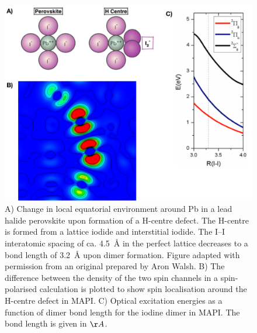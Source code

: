 \begin{figure}[h!]   %
\centering
  \includegraphics[width=0.9\columnwidth]{figures/ch6/spin_localisation.png}
  \caption[Spin localisation and optical excitation at the H-centre defect in MAPI]{A) Change in local equatorial environment around Pb in a lead halide perovskite upon formation of a H-centre defect. The H-centre is formed from a lattice iodide and interstitial iodide. The I--I interatomic spacing of ca. \SI{4.5}{\angstrom} in the perfect lattice decreases to a bond length of \SI{3.2}{\angstrom} upon dimer formation. Figure adapted with permission from an original prepared by Aron Walsh. B)  The difference between the density of the two spin channels in a spin-polarised calculation is plotted to show spin localisation around the H-centre defect in MAPI. C) Optical excitation energies as a function of dimer bond length for the iodine dimer in MAPI. The bond length is given in $\AA$.}
\label{spin_localisation}
\end{figure}


